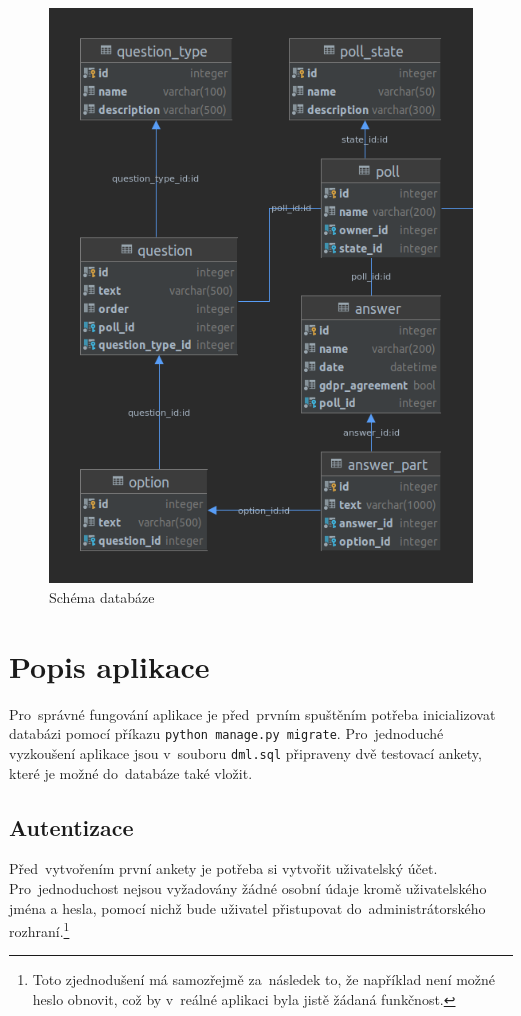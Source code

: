 \documentclass[czech]{pyt-report}
\begin{document}
\begin{figure}[h]
  \centering\leavevmode
  \includegraphics[width=.9\linewidth]{img/db-structure.png}\vskip-0.2cm
  \caption{Schéma databáze}
  \label{fig:db-schema}
\end{figure}

\section{Popis aplikace}

Pro~správné fungování aplikace je před~prvním spuštěním potřeba inicializovat databázi pomocí příkazu \texttt{python manage.py migrate}. Pro~jednoduché vyzkoušení aplikace jsou v~souboru \texttt{dml.sql} připraveny dvě testovací ankety, které je možné do~databáze také vložit.

\subsection{Autentizace}
Před~vytvořením první ankety je potřeba si vytvořit uživatelský účet. Pro~jednoduchost nejsou vyžadovány žádné osobní údaje kromě uživatelského jména a hesla, pomocí nichž bude uživatel přistupovat do~administrátorského rozhraní.\footnote{Toto zjednodušení má samozřejmě za~následek to, že například není možné heslo obnovit, což by v~reálné aplikaci byla jistě žádaná funkčnost.}
\end{document}
